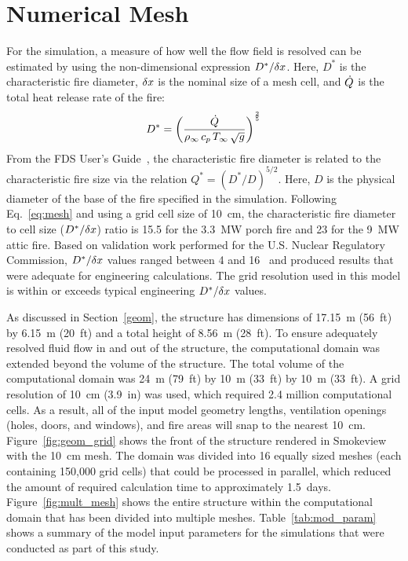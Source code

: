 \documentclass[12pt,oneside]{book}
\begin{document}
\clearpage


\section{Numerical Mesh}
\label{mesh}

For the simulation, a measure of how well the flow field is resolved can be estimated by using the non-dimensional expression $D^*/\delta x$. Here, $D^*$ is the characteristic fire diameter, $\delta x$ is the nominal size of a mesh cell, and $\dot{Q}$ is the total heat release rate of the fire:
\begin{equation}
D^* = \left(
     \frac{\dot{Q}}{\rho_\infty \, c_p \, T_\infty \, \sqrt{g}}
     \right)^\frac{2}{5} 
\label{eq:mesh}
\end{equation}   
From the FDS User's Guide~\cite{FDS_Users_Guide}, the characteristic fire diameter is related to the characteristic fire size via the
relation $Q^* = (D^*/D)^{5/2}$. Here, $D$ is the physical diameter of the base of the fire specified in the simulation. Following Eq.~\ref{eq:mesh} and using a grid cell size of 10~cm, the characteristic fire diameter to cell size ($D^*/\delta x$) ratio is 15.5 for the 3.3~MW porch fire and 23 for the 9~MW attic fire. Based on validation work performed for the U.S. Nuclear Regulatory Commission, $D^*/\delta x$ values ranged between 4 and 16~\cite{NUREG_1824} and produced results that were adequate for engineering calculations. The grid resolution used in this model is within or exceeds typical engineering $D^*/\delta x$ values.

As discussed in Section~\ref{geom}, the structure has dimensions of 17.15~m (56~ft) by 6.15~m (20~ft) and a total height of 8.56~m (28~ft). To ensure adequately resolved fluid flow in and out of the structure, the computational domain was extended beyond the volume of the structure. The total volume of the computational domain was 24~m (79~ft) by 10~m (33~ft) by 10~m (33~ft). A grid resolution of 10~cm (3.9~in) was used, which required 2.4 million computational cells. As a result, all of the input model geometry lengths, ventilation openings (holes, doors, and windows), and fire areas will snap to the nearest 10~cm. Figure~\ref{fig:geom_grid} shows the front of the structure rendered in Smokeview with the 10~cm mesh. The domain was divided into 16 equally sized meshes (each containing 150,000 grid cells) that could be processed in parallel, which reduced the amount of required calculation time to approximately 1.5~days. Figure~\ref{fig:mult_mesh} shows the entire structure within the computational domain that has been divided into multiple meshes. Table~\ref{tab:mod_param} shows a summary of the model input parameters for the simulations that were conducted as part of this study.
\end{document}
